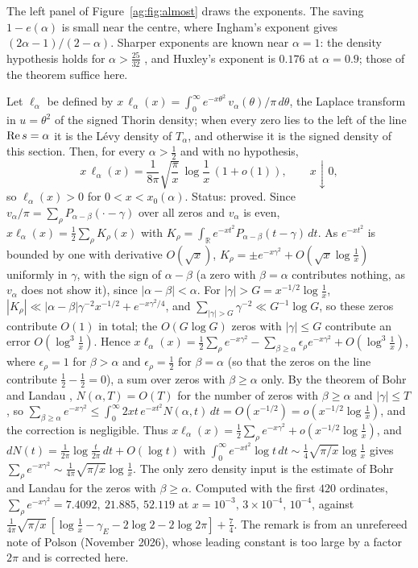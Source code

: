 The left panel of Figure~\ref{ag:fig:almost} draws the exponents. The saving $1-e(\alpha)$ is small near the centre, where Ingham's exponent gives $(2\alpha-1)/(2-\alpha)$. Sharper exponents are known near $\alpha=1$: the density hypothesis holds for $\alpha>\frac{25}{32}$ \cite[p.~133]{Bourgain00}, and Huxley's exponent \cite{Huxley72} is $0.176$ at $\alpha=0.9$; those of the theorem suffice here.

\begin{remark}\label{ag:rem:density}
Let $\ell_\alpha$ be defined by $x\,\ell_\alpha(x)=\int_0^\infty e^{-x\theta^2}\,v_\alpha(\theta)/\pi\,d\theta$, the Laplace transform in $u=\theta^2$ of the signed Thorin density; when every zero lies to the left of the line $\operatorname{Re} s=\alpha$ it is the L\'evy density of $T_\alpha$, and otherwise it is the signed density of this section. Then, for every $\alpha>\frac12$ and with no hypothesis,
\[
x\,\ell_\alpha(x)=\frac1{8\pi}\sqrt{\frac\pi x}\,\log\frac1x\,(1+o(1)),\qquad x\downarrow0,
\]
so $\ell_\alpha(x)>0$ for $0<x<x_0(\alpha)$. Status: proved. Since $v_\alpha/\pi=\sum_\rho P_{\alpha-\beta}(\cdot-\gamma)$ over all zeros and $v_\alpha$ is even, $x\ell_\alpha(x)=\frac12\sum_\rho K_\rho(x)$ with $K_\rho=\int_{\mathbb R}e^{-xt^2}P_{\alpha-\beta}(t-\gamma)\,dt$. As $e^{-xt^2}$ is bounded by one with derivative $O(\sqrt x)$, $K_\rho=\pm e^{-x\gamma^2}+O(\sqrt x\log\frac1x)$ uniformly in $\gamma$, with the sign of $\alpha-\beta$ (a zero with $\beta=\alpha$ contributes nothing, as $v_\alpha$ does not show it), since $|\alpha-\beta|<\alpha$. For $|\gamma|>G=x^{-1/2}\log\frac1x$, $|K_\rho|\ll|\alpha-\beta|\gamma^{-2}x^{-1/2}+e^{-x\gamma^2/4}$, and $\sum_{|\gamma|>G}\gamma^{-2}\ll G^{-1}\log G$, so these zeros contribute $O(1)$ in total; the $O(G\log G)$ zeros with $|\gamma|\le G$ contribute an error $O(\log^3\frac1x)$. Hence $x\ell_\alpha(x)=\frac12\sum_\rho e^{-x\gamma^2}-\sum_{\beta\ge\alpha}\epsilon_\rho e^{-x\gamma^2}+O(\log^3\frac1x)$, where $\epsilon_\rho=1$ for $\beta>\alpha$ and $\epsilon_\rho=\frac12$ for $\beta=\alpha$ (so that the zeros on the line contribute $\frac12-\frac12=0$), a sum over zeros with $\beta\ge\alpha$ only. By the theorem of Bohr and Landau \cite{BL14}, $N(\alpha,T)=O(T)$ for the number of zeros with $\beta\ge\alpha$ and $|\gamma|\le T$, so $\sum_{\beta\ge\alpha}e^{-x\gamma^2}\le\int_0^\infty2xt\,e^{-xt^2}N(\alpha,t)\,dt=O(x^{-1/2})=o(x^{-1/2}\log\frac1x)$, and the correction is negligible. Thus $x\ell_\alpha(x)=\frac12\sum_\rho e^{-x\gamma^2}+o(x^{-1/2}\log\frac1x)$, and $dN(t)=\frac1{2\pi}\log\frac t{2\pi}\,dt+O(\log t)$ with $\int_0^\infty e^{-xt^2}\log t\,dt\sim\frac14\sqrt{\pi/x}\log\frac1x$ gives $\sum_\rho e^{-x\gamma^2}\sim\frac1{4\pi}\sqrt{\pi/x}\log\frac1x$. The only zero density input is the estimate of Bohr and Landau \cite{BL14} for the zeros with $\beta\ge\alpha$. Computed with the first $420$ ordinates, $\sum_\rho e^{-x\gamma^2}=7.4092,\ 21.885,\ 52.119$ at $x=10^{-3},\,3\times10^{-4},\,10^{-4}$, against $\frac1{4\pi}\sqrt{\pi/x}\,[\log\frac1x-\gamma_E-2\log2-2\log2\pi]+\frac74$. The remark is from an unrefereed note of Polson (November 2026), whose leading constant is too large by a factor $2\pi$ and is corrected here.
\end{remark}

